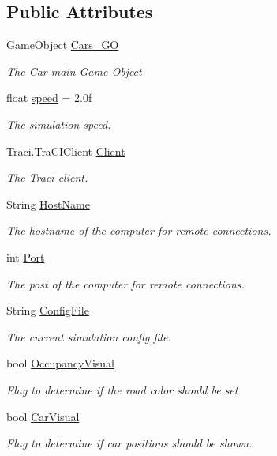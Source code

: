 \subsection*{Public Attributes}
\begin{DoxyCompactItemize}
\item 
Game\+Object \mbox{\hyperlink{class_traci_controller_a29b2da0a754eabda5002fad9b07213c6}{Cars\+\_\+\+GO}}
\begin{DoxyCompactList}\small\item\em The Car main Game Object \end{DoxyCompactList}\item 
float \mbox{\hyperlink{class_traci_controller_abc82770640e1620b43607ad292e97f4e}{speed}} = 2.\+0f
\begin{DoxyCompactList}\small\item\em The simulation speed. \end{DoxyCompactList}\item 
Traci.\+Tra\+C\+I\+Client \mbox{\hyperlink{class_traci_controller_a2ad927f803db7f58f36623b8c7e4cbf8}{Client}}
\begin{DoxyCompactList}\small\item\em The Traci client. \end{DoxyCompactList}\item 
String \mbox{\hyperlink{class_traci_controller_aed0a2042d258363ec5726b8b7c9e40b3}{Host\+Name}}
\begin{DoxyCompactList}\small\item\em The hostname of the computer for remote connections. \end{DoxyCompactList}\item 
int \mbox{\hyperlink{class_traci_controller_a480600f51cbbd8506fbdca8fd3179cb3}{Port}}
\begin{DoxyCompactList}\small\item\em The post of the computer for remote connections. \end{DoxyCompactList}\item 
String \mbox{\hyperlink{class_traci_controller_a333aa35fec78296dc265107576c8dcda}{Config\+File}}
\begin{DoxyCompactList}\small\item\em The current simulation config file. \end{DoxyCompactList}\item 
bool \mbox{\hyperlink{class_traci_controller_ad0ad2e07d2af2be66e30233cf39e7d88}{Occupancy\+Visual}}
\begin{DoxyCompactList}\small\item\em Flag to determine if the road color should be set \end{DoxyCompactList}\item 
bool \mbox{\hyperlink{class_traci_controller_a0e5d2ec61d361d163647ed1eac5cbeca}{Car\+Visual}}
\begin{DoxyCompactList}\small\item\em Flag to determine if car positions should be shown. \end{DoxyCompactList}\end{DoxyCompactItemize}


